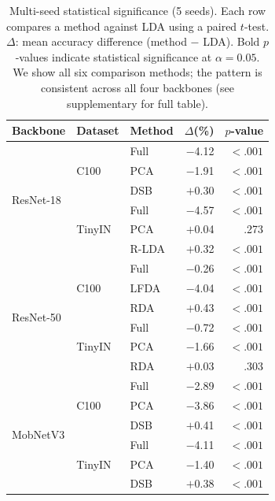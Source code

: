 \begin{table}[t]
\centering
\caption{Multi-seed statistical significance (5 seeds). Each row compares a method against LDA using a paired $t$-test. $\Delta$: mean accuracy difference (method $-$ LDA). Bold $p$-values indicate statistical significance at $\alpha = 0.05$. We show all six comparison methods; the pattern is consistent across all four backbones (see supplementary for full table).}
\label{tab:significance}
\small
\setlength{\tabcolsep}{3pt}
\begin{tabular}{@{}l l l r r@{}}
\toprule
Backbone & Dataset & Method & $\Delta$(\%) & $p$-value \\
\midrule
\multirow{6}{*}{ResNet-18}
& \multirow{3}{*}{C100}  & Full  & $-$4.12 & $\mathbf{<.001}$ \\
&                         & PCA   & $-$1.91 & $\mathbf{<.001}$ \\
&                         & DSB   & $+$0.30 & $\mathbf{<.001}$ \\
& \multirow{3}{*}{TinyIN} & Full  & $-$4.57 & $\mathbf{<.001}$ \\
&                         & PCA   & $+$0.04 & .273           \\
&                         & R-LDA & $+$0.32 & $\mathbf{<.001}$ \\
\midrule
\multirow{6}{*}{ResNet-50}
& \multirow{3}{*}{C100}  & Full  & $-$0.26 & $\mathbf{<.001}$ \\
&                         & LFDA  & $-$4.04 & $\mathbf{<.001}$ \\
&                         & RDA   & $+$0.43 & $\mathbf{<.001}$ \\
& \multirow{3}{*}{TinyIN} & Full  & $-$0.72 & $\mathbf{<.001}$ \\
&                         & PCA   & $-$1.66 & $\mathbf{<.001}$ \\
&                         & RDA   & $+$0.03 & .303           \\
\midrule
\multirow{6}{*}{MobNetV3}
& \multirow{3}{*}{C100}  & Full  & $-$2.89 & $\mathbf{<.001}$ \\
&                         & PCA   & $-$3.86 & $\mathbf{<.001}$ \\
&                         & DSB   & $+$0.41 & $\mathbf{<.001}$ \\
& \multirow{3}{*}{TinyIN} & Full  & $-$4.11 & $\mathbf{<.001}$ \\
&                         & PCA   & $-$1.40 & $\mathbf{<.001}$ \\
&                         & DSB   & $+$0.38 & $\mathbf{<.001}$ \\

\end{tabular}
\end{table}
